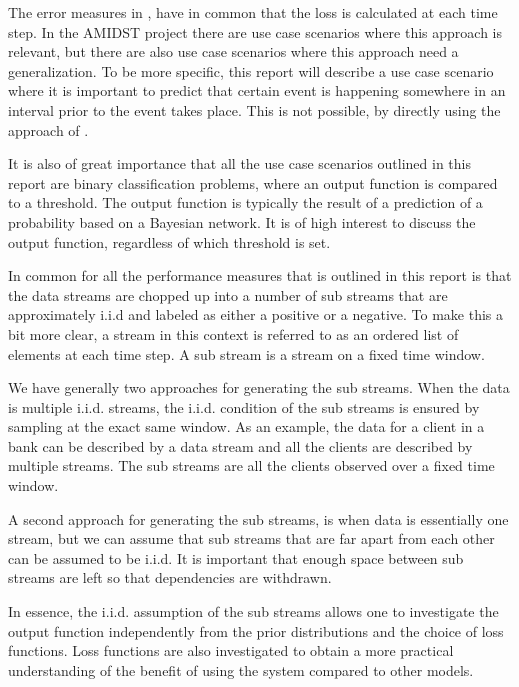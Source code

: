 The error measures in \cite{Gam13}, have in common that the loss is calculated at each time step. In the AMIDST project there are use case scenarios where this approach is relevant, but there are also use case scenarios where this approach need a generalization.  To be more specific, this report will describe a use case scenario where it is important to predict that certain event is happening somewhere in an interval prior to the event takes place.  This is not possible, by directly using the approach of \cite{Gam13}.  

It is also of great importance that all the use case scenarios outlined in this report are binary classification problems, where an output function is compared to a threshold.  The output function is typically the result of a prediction of a probability based  on a Bayesian network.  It is of high interest to discuss the output function, regardless of which threshold is set.  

In common for all the performance measures that is outlined in this report is that the data streams are chopped up into a number of sub streams that are approximately i.i.d and labeled as either a positive or a negative.  To make this a bit more clear, a stream in this context is referred to as an ordered list of elements at each time step.  A sub stream is a stream on a fixed time window.

We have generally two approaches for generating the sub streams.  When the data is multiple i.i.d. streams, the i.i.d. condition of the sub streams is ensured by sampling at the exact same window.  As an example, the data for a client in a bank can be described by a data stream and all the clients are described by multiple streams.  The sub streams are all the clients observed over a fixed time window.

A second approach for generating the sub streams, is when data is essentially one stream, but we can assume that sub streams that are far apart from each other can be assumed to be i.i.d. It is important that enough space between sub streams are left so that dependencies are withdrawn.

In essence, the i.i.d. assumption of the sub streams allows one to investigate the output function independently from the prior distributions and the choice of loss functions.  Loss functions are also investigated to obtain a more practical understanding of the benefit of using the system compared to other models.   


%

